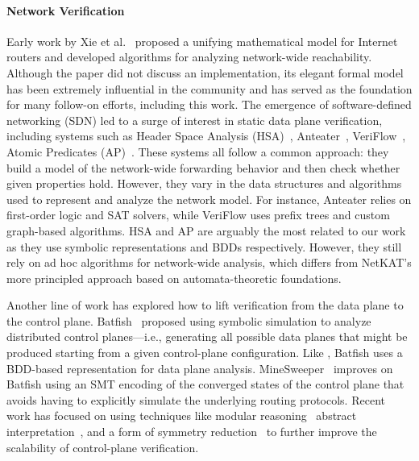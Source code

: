 \documentclass[acmsmall,dvipsnames,nonacm]{acmart}
\begin{document}
\paragraph*{Network Verification}
%
Early work by Xie et al.~\cite{Xie2005} proposed a unifying
mathematical model for Internet routers and developed algorithms for
analyzing network-wide reachability. Although the paper did not
discuss an implementation, its elegant formal model has been extremely
influential in the community and has served as the foundation for many
follow-on efforts, including this work. The emergence of
software-defined networking (SDN) led to a surge of interest in static
data plane verification, including systems such as Header Space
Analysis (HSA)~\cite{Kazemian2012}, Anteater~\cite{Mai2011},
VeriFlow~\cite{Khurshid2012}, Atomic Predicates
(AP)~\cite{Yang2016}. These systems all follow a common approach: they
build a model of the network-wide forwarding behavior and then check
whether given properties hold. However, they vary in the data
structures and algorithms used to represent and analyze the network
model. For instance, Anteater relies on first-order logic and SAT
solvers, while VeriFlow uses prefix trees and custom graph-based
algorithms. HSA and AP are arguably the most related to our work as
they use symbolic representations and BDDs respectively. However, they
still rely on ad hoc algorithms for network-wide analysis, which
differs from NetKAT's more principled approach based on
automata-theoretic foundations.

Another line of work has explored how to lift verification from the
data plane to the control plane. Batfish~\cite{Fogel2015,Brown2023}
proposed using symbolic simulation to analyze distributed control
planes---i.e., generating all possible data planes that might be
produced starting from a given control-plane configuration. Like
\KATch, Batfish uses a BDD-based representation for data plane
analysis. MineSweeper~\cite{Beckett2017} improves on Batfish using an
SMT encoding of the converged states of the control plane that avoids
having to explicitly simulate the underlying routing protocols. Recent
work has focused on using techniques like modular
reasoning~\cite{Tang2023,Thijm2023} abstract
interpretation~\cite{Beckett2020}, and a form of symmetry
reduction~\cite{Beckett2018} to further improve the scalability of
control-plane verification.

\paragraph*{\NetKAT}
\end{document}
